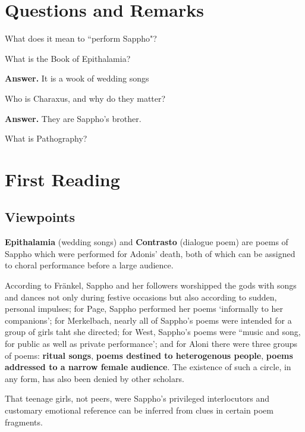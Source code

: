 \section{Questions and Remarks}
\label{sec:QR2}

\begin{qst}
    What does it mean to ``perform Sappho"?
\end{qst}

\begin{qst}
    What is the Book of Epithalamia?
\end{qst}
\textbf{Answer.} It is a wook of wedding songs


\begin{qst}
    Who is Charaxus, and why do they matter?
\end{qst}
\textbf{Answer.} They are Sappho's brother.

\begin{qst}
    What is Pathography?
\end{qst}



\section{First Reading}
\label{sec:FirRead2}


\subsection{Viewpoints}

\textbf{Epithalamia} (wedding songs) and \textbf{Contrasto} (dialogue poem) are poems of Sappho which were performed for Adonis' death, both of which can be assigned to choral performance before a large audience.

According to Fr\"{a}nkel, Sappho and her followers worshipped the gods with songs and dances not only during festive occasions but also according to sudden, personal impulses; for Page, Sappho performed her poems `informally to her companions'; for Merkelbach, nearly all of Sappho's poems were intended for a group of girls taht she directed; for West, Sappho's poems were ``music and song, for public as well as private performance'; and for Aloni there were three groups of poems: \textbf{ritual songs}, \textbf{poems destined to heterogenous people}, \textbf{poems addressed to a narrow female audience}. The existence of such a circle, in any form, has also been denied by other scholars.

That teenage girls, not peers, were Sappho's privileged interlocutors and customary emotional reference can be inferred from clues in certain poem fragments.

